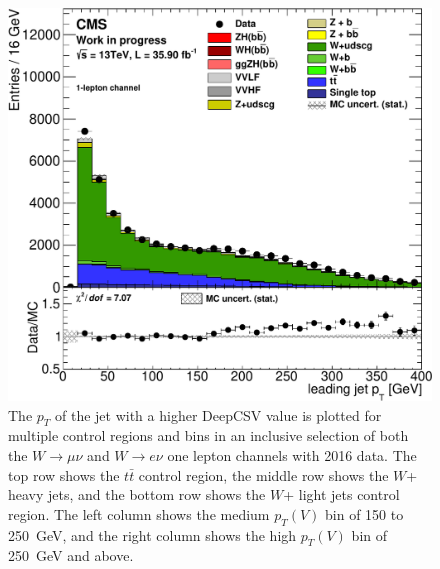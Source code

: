 \begin{figure}
  \includegraphics[width=0.42\linewidth]{figures/2016_Wln/Wlf_high_Wln__Hj0_pt_.pdf}
  \caption[Control region plots for one lepton in 2016]{
    The $p_T$ of the jet with a higher DeepCSV value
    is plotted for multiple control regions and bins in
    an inclusive selection of both the $W\rightarrow \mu\nu$ and $W\rightarrow e\nu$
    one lepton channels with 2016 data.
    The top row shows the $t\bar{t}$ control region,
    the middle row shows the $W$+ heavy jets,
    and the bottom row shows the $W$+ light jets control region.
    The left column shows the medium $p_T(V)$ bin of 150 to \SI{250}{GeV},
    and the right column shows the high $p_T(V)$ bin of \SI{250}{GeV} and above.
  }
  \label{fig:2016_Wln_j0pt}
\end{figure}

